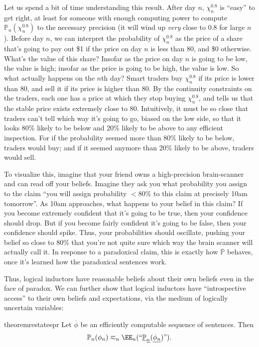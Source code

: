 \documentclass[authordate,onecolumn,noenvironments]{miri-tech-article}
\numberwithin{equation}{subsection}
\newcommand{\quot}[1]{``#1"}
\newcommand{\enc}[1]{{\underline{#1}}}
\newcommand{\seq}[1]{{\overline{#1}}}
\newcommand{\nn}{n}
\newcommand{\phis}{\seq{\phi}}
\newcommand{\rparenthetical}[1]{\hfill\upshape{{\small (#1)}}} %
\newcommand{\proofin}[1]{\rparenthetical{Proof in:~#1.}}
\newcommand{\BelState}{\mathbb{P}}
\newcommand{\pt}{\BelState}
\newcommand{\MP}{\seq{\pt}}
\begin{document}
Let us spend a bit of time understanding this result. After day $\nn$, $\chi_\nn^{0.8}$ is ``easy'' to get right, at least for someone with enough computing power to compute $\pt_\nn(\chi_\nn^{0.8})$ to the necessary precision (it will wind up \emph{very} close to 0.8 for large $\nn$). Before day $\nn$, we can interpret the probability of $\chi_\nn^{0.8}$ as the price of a share that's going to pay out \$1 if the price on day $\nn$ is less than 80\textcent{}, and \$0 otherwise. What's the value of this share? Insofar as the price on day $\nn$ is going to be low, the value is high; insofar as the price is going to be high, the value is low. So what actually happens on the $\nn$th day? Smart traders buy $\chi_\nn^{0.8}$ if its price is lower than 80\textcent{}, and sell it if its price is higher than 80\textcent{}. By the continuity constraints on the traders, each one has a price at which they stop buying $\chi_\nn^{0.8}$, and  tells us that the stable price exists extremely close to 80\textcent{}. Intuitively, it must be so close that traders can't tell which way it's going to go, biased on the low side, so that it looks 80\% likely to be below and 20\% likely to be above to any efficient inspection. For if the probability seemed more than 80\% likely to be below, traders would buy; and if it seemed anymore than 20\% likely to be above, traders would sell.

To visualize this, imagine that your friend owns a high-precision brain-scanner and can read off your beliefs. Imagine they ask you what probability you assign to the claim ``you will assign probability $<$80\% to this claim at precisely 10am tomorrow''. As 10am approaches, what happens to your belief in this claim? If you become extremely confident that it's going to be true, then your confidence should drop. But if you become fairly confident it's going to be false, then your confidence should spike. Thus, your probabilities should oscillate, pushing your belief so close to 80\% that you're not quite sure which way the brain scanner will actually call it. In response to a paradoxical claim, this is exactly how $\MP$ behaves, once it's learned how the paradoxical sentences work.

Thus, logical inductors have reasonable beliefs about their own beliefs even in the face of paradox. We can further show that logical inductors have ``introspective access'' to their own beliefs and expectations, via the medium of logically uncertain variables:

\begin{restatable}{theorem}{restateepr}\label{thm:epr}
  Let $\phis$ be an efficiently computable sequence of sentences. Then
  \[
    \pt_\nn(\phi_\nn)\eqsim_\nn\EE_\nn(\quot{\enc{\pt}_\enc{\nn}(\enc{\phi_\nn})}).
  \]
  \proofin{\ref{app:epr}}
\end{restatable}
\end{document}
